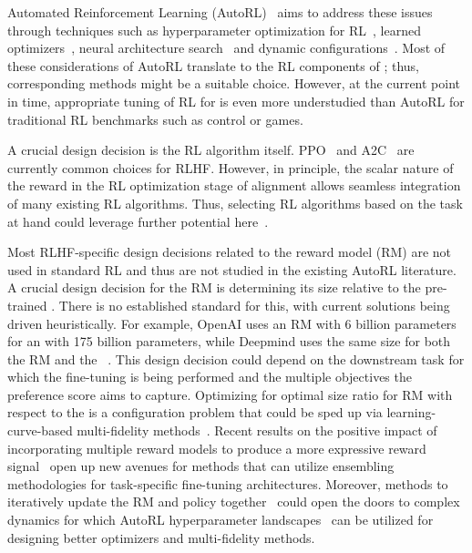 \documentclass[10pt]{article} %
\begin{document}
Automated Reinforcement Learning (AutoRL)~\citep{parkerholder-jair22a} aims to address these issues through techniques such as hyperparameter optimization for RL~\citep{li-kdd19a,parkerholder-neurips20a,wan-automl22a}, learned optimizers~\citep{lan-arxiv23a}, neural architecture search~\citep{wan-automl22a} and dynamic configurations~\citep{adriaensen-jair22a}.
Most of these considerations of AutoRL translate to the RL components of \LLMs; thus, corresponding methods might be a suitable choice.
However, at the current point in time, appropriate tuning of RL for \LLM is even more understudied than AutoRL for traditional RL benchmarks such as control or games.

A crucial design decision is the RL algorithm itself. PPO~\citep{schulman-arxiv17a} and A2C~\citep{mnih-icml16a} are currently common choices for RLHF.
However, in principle, the scalar nature of the reward in the RL optimization stage of \LLM alignment allows seamless integration of many existing RL algorithms. 
Thus, selecting RL algorithms based on the task at hand could leverage further potential here~\citep{laroche-iclr18a}.

Most RLHF-specific design decisions related to the reward model (RM) are not used in standard RL and thus are not studied in the existing AutoRL literature.
A crucial design decision for the RM is determining its size relative to the pre-trained \LLM.
There is no established standard for this, with current solutions being driven heuristically.
For example, OpenAI uses an RM with 6 billion parameters for an \LLM with 175 billion parameters, while Deepmind uses the same size for both the RM and the \LLM~\citep{lambert-hf22a}.
This design decision could depend on the downstream task for which the fine-tuning is being performed and the multiple objectives the preference score aims to capture.
Optimizing for optimal size ratio for RM with respect to the \LLM is a configuration problem that could be sped up via learning-curve-based multi-fidelity methods~\citep{klein-iclr17a,jawed-ecml21a,ruhkopf-tmlr23a}.
Recent results on the positive impact of incorporating multiple reward models to produce a more expressive reward signal~\citep{wu-arxiv23a} open up new avenues for methods that can utilize ensembling methodologies for task-specific fine-tuning architectures.
Moreover, methods to iteratively update the RM and policy together~\citep{lambert-hf22a,bai-arxiv22a} could open the doors to complex dynamics for which AutoRL hyperparameter landscapes~\citep{mohan-automlconf23a} can be utilized for designing better optimizers and multi-fidelity methods.
\end{document}
